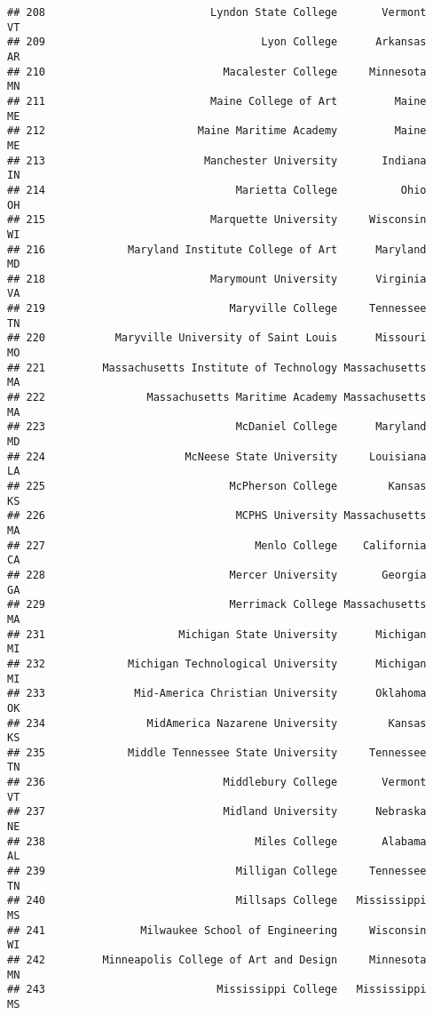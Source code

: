 \documentclass[
]{article}
\begin{document}
\begin{verbatim}
## 208                          Lyndon State College       Vermont         VT
## 209                                  Lyon College      Arkansas         AR
## 210                            Macalester College     Minnesota         MN
## 211                          Maine College of Art         Maine         ME
## 212                        Maine Maritime Academy         Maine         ME
## 213                         Manchester University       Indiana         IN
## 214                              Marietta College          Ohio         OH
## 215                          Marquette University     Wisconsin         WI
## 216             Maryland Institute College of Art      Maryland         MD
## 218                          Marymount University      Virginia         VA
## 219                             Maryville College     Tennessee         TN
## 220           Maryville University of Saint Louis      Missouri         MO
## 221         Massachusetts Institute of Technology Massachusetts         MA
## 222                Massachusetts Maritime Academy Massachusetts         MA
## 223                              McDaniel College      Maryland         MD
## 224                      McNeese State University     Louisiana         LA
## 225                             McPherson College        Kansas         KS
## 226                              MCPHS University Massachusetts         MA
## 227                                 Menlo College    California         CA
## 228                             Mercer University       Georgia         GA
## 229                             Merrimack College Massachusetts         MA
## 231                     Michigan State University      Michigan         MI
## 232             Michigan Technological University      Michigan         MI
## 233              Mid-America Christian University      Oklahoma         OK
## 234                MidAmerica Nazarene University        Kansas         KS
## 235             Middle Tennessee State University     Tennessee         TN
## 236                            Middlebury College       Vermont         VT
## 237                            Midland University      Nebraska         NE
## 238                                 Miles College       Alabama         AL
## 239                              Milligan College     Tennessee         TN
## 240                              Millsaps College   Mississippi         MS
## 241               Milwaukee School of Engineering     Wisconsin         WI
## 242         Minneapolis College of Art and Design     Minnesota         MN
## 243                           Mississippi College   Mississippi         MS

\end{verbatim}
\end{document}
